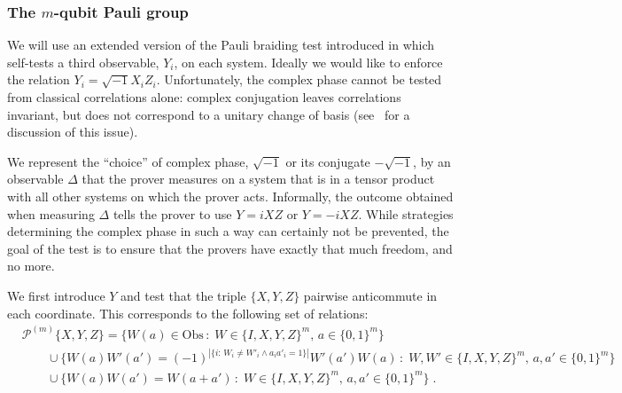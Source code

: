 \documentclass{toc}
\newcommand{\setft}[1]{\mathrm{#1}}
\newcommand{\Obs}{\setft{Obs}}
\newcommand{\paulin}{\mathcal{P}^{(m)}\!}
\begin{document}
%
%

\subsubsection{The \texorpdfstring{$m$}{m}-qubit Pauli group}
\label{sec:e-pbt}


We will use an extended version of the Pauli braiding test introduced in  which self-tests a third observable, $Y_i$, on each system. Ideally we would like to enforce the relation $Y_i=\sqrt{-1}X_iZ_i$. Unfortunately, the complex phase cannot be tested from classical correlations alone: complex conjugation leaves correlations invariant, but does not correspond to a unitary change of basis  (see~\cite[Appendix A]{reichardt2012classicalarxiv} for a discussion of this issue). 

We represent the ``choice'' of complex phase, $\sqrt{-1}$ or its conjugate $-\sqrt{-1}$, by an observable $\Delta$ that the prover measures on a system that is in a tensor product with all other systems on which the prover acts. Informally, the outcome obtained when measuring $\Delta$ tells the prover to use $Y = i XZ$ or $Y=-iXZ$. While strategies determining the complex phase in such a way can certainly not be prevented, the goal of the test is to ensure that the provers have exactly that much freedom, and no more. 

We first introduce $Y$ and test that the triple $\{X,Y,Z\}$ pairwise anticommute in each coordinate. This corresponds to the following set of relations: 
\begin{align*}
& {\paulin}\{X,Y,Z\} = \Big\{ W(a)\in\Obs\,:\;W \in \{I,X,Y,Z\}^m,\,a\in\{0,1\}^m\Big\} \\
&\qquad\cup \Big\{W(a)W'(a')=(-1)^{|\{i:\,W_i\neq W'_i \wedge a_ia'_i=1\}|} W'(a')W(a)\,:\;W,W' \in \{I,X,Y,Z\}^m,\,a,a'\in\{0,1\}^m\Big\}\\
&\qquad \cup\Big\{ W(a)W(a')=W(a+a')\,:\;W \in \{I,X,Y,Z\}^m,\,a,a'\in\{0,1\}^m\Big\}\;.
\end{align*}
\end{document}
